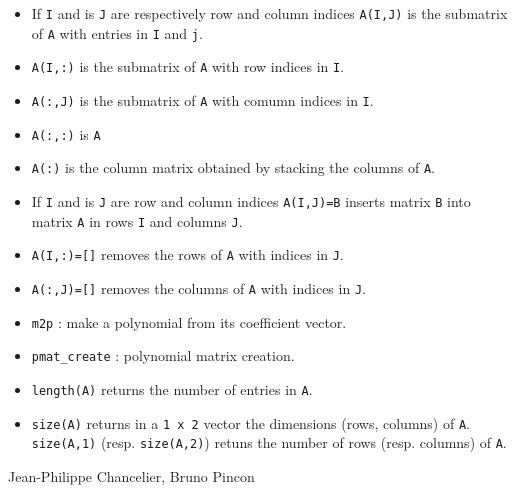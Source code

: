 \begin{itemize}
   \item If \verb+I+ and is \verb+J+ are respectively row and column indices \verb+A(I,J)+ is the submatrix of \verb+A+ with entries in \verb+I+ and \verb+j+.
   \item \verb+A(I,:)+ is the submatrix of \verb+A+ with row indices in \verb+I+.
   \item \verb+A(:,J)+ is the submatrix of \verb+A+ with comumn indices in \verb+I+.
   \item \verb+A(:,:)+ is \verb+A+
   \item \verb+A(:)+  is the column matrix obtained by stacking the columns of \verb+A+.
\end{itemize}

\begin{itemize}
   \item If \verb+I+ and is \verb+J+ are row and column indices \verb+A(I,J)=B+ inserts
     matrix \verb+B+ into matrix \verb+A+ in rows \verb+I+ and columns \verb!J!.
   \item \verb+A(I,:)=[]+ removes the rows of \verb+A+ with indices in \verb+J+.
   \item \verb+A(:,J)=[]+ removes the columns of \verb+A+ with indices in \verb+J+.
\end{itemize}

\begin{itemize}
   \item \verb+m2p+ : make a polynomial from its coefficient vector.
   \item \verb+pmat_create+ : polynomial matrix creation.
   \item \verb+length(A)+ returns the number of entries in \verb+A+.
   \item \verb+size(A)+ returns in a \verb+1 x 2+ vector the dimensions (rows, columns)
     of \verb+A+. \verb+size(A,1)+ (resp. \verb+size(A,2)+) retuns the number of rows 
     (resp. columns) of \verb+A+.
\end{itemize}

\begin{manseealso}

\end{manseealso}

\begin{authors}
   Jean-Philippe Chancelier, Bruno Pincon
\end{authors}
